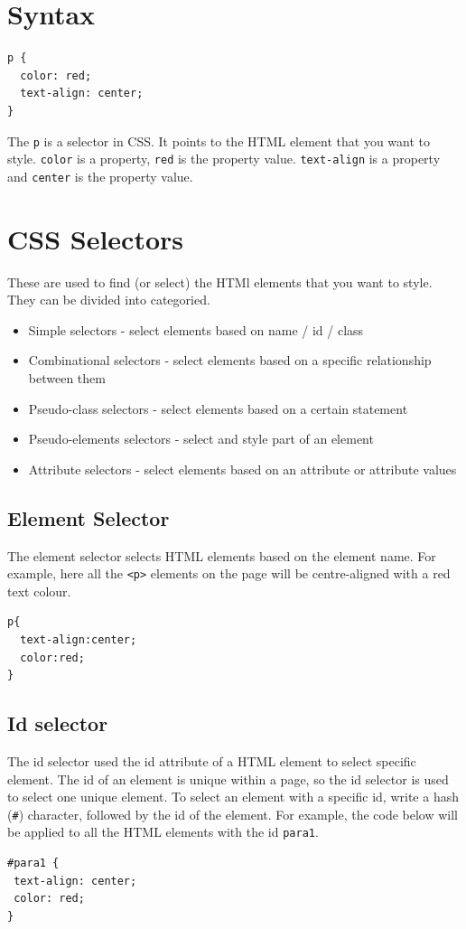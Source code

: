 \documentclass{thomasClass}
\begin{document}
\section{Syntax}
\begin{Verbatim}[breaklines=true, breakanywhere=true]
p {
  color: red;
  text-align: center;
}
\end{Verbatim}
The \verb|p| is a selector in CSS. It points to the HTML element that you want to style. \verb|color| is a property, \verb|red| is the property value. \verb|text-align| is a property and \verb|center| is the property value. 
\section{CSS Selectors}
These are used to find (or select) the HTMl elements that you want to style. They can be divided into categoried.
\begin{itemize}
    \item Simple selectors - select elements based on name / id / class
    \item Combinational selectors - select elements based on a specific relationship between them
    \item Pseudo-class selectors - select elements based on a certain statement
    \item Pseudo-elements selectors - select and style part of an element
    \item Attribute selectors - select elements based on an attribute or attribute values
\end{itemize}
\subsection{Element Selector}
The element selector selects HTML elements based on the element name. For example, here all the \verb|<p>| elements on the page will be centre-aligned with a red text colour.
\begin{verbatim}
p{
  text-align:center;
  color:red;
}
\end{verbatim}
\subsection{Id selector}
The id selector used the id attribute of a HTML element to select specific element. The id of an element is unique within a page, so the id selector is used to select one unique element. To select an element with a specific id, write a hash (\verb|#|) character, followed by the id of the element. For example, the code below will be applied to all the HTML elements with the id \verb|para1|.
\begin{verbatim}
#para1 {
 text-align: center;
 color: red;
}
\end{verbatim}
\end{document}
